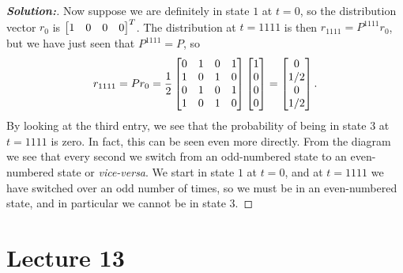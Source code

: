 \documentclass[a4paper]{amsart}
\theoremstyle{definition}
\newenvironment{solution}{\begin{proof}[\textbf{Solution:}] \vphantom{u}}{\end{proof}}
\begin{document}
\begin{solution}
 Now suppose we are definitely in state $1$ at $t=0$, so the
 distribution vector $r_0$ is $\left[\begin{matrix} 1 & 0 & 0 & 0 \end{matrix}\right]^T$.  The
 distribution at $t=1111$ is then $r_{1111}=P^{1111}r_0$, but we have
 just seen that $P^{1111}=P$, so 
 \[ r_{1111} = Pr_0 =
    \frac{1}{2}
     \left[\begin{matrix} 
      0 & 1 & 0 & 1 \\
      1 & 0 & 1 & 0 \\
      0 & 1 & 0 & 1 \\
      1 & 0 & 1 & 0
     \end{matrix}\right]
     \left[\begin{matrix} 1 \\ 0 \\ 0 \\ 0 \end{matrix}\right] =
     \left[\begin{matrix} 0 \\ 1/2 \\ 0 \\ 1/2 \end{matrix}\right].
 \]
 By looking at the third entry, we see that the probability of being
 in state $3$ at $t=1111$ is zero.  In fact, this can be seen even
 more directly.  From the diagram we see that every second we switch
 from an odd-numbered state to an even-numbered state or
 \emph{vice-versa}.  We start in state $1$ at $t=0$, and at $t=1111$ we
 have switched over an odd number of times, so we must be in an
 even-numbered state, and in particular we cannot be in state $3$.
\end{solution}

\section{Lecture 13}
\end{document}
